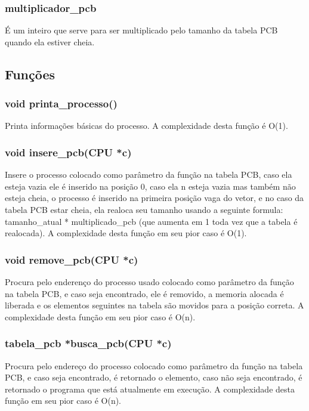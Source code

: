 \documentclass[a4paper, 12pt]{article}
\begin{document}
     \subsubsection{multiplicador\_pcb} É um inteiro que serve para ser multiplicado pelo tamanho da tabela PCB quando ela estiver cheia.
 

\subsection{Funções}
 \subsubsection{void printa\_processo()}
    Printa informações básicas do processo. A complexidade desta função é O(1).
    
 \subsubsection{void insere\_pcb(CPU *c)}
    Insere o processo colocado como parâmetro da função na tabela PCB, caso ela esteja vazia ele é inserido na posição 0, caso ela n esteja vazia mas também não esteja cheia, o processo é inserido na primeira posição vaga do vetor, e no caso da tabela PCB estar cheia, ela realoca seu tamanho usando a seguinte formula: tamanho\_atual * multiplicado\_pcb (que aumenta em 1 toda vez que a tabela é realocada). A complexidade desta função em seu pior caso é O(1).
    
 \subsubsection{void remove\_pcb(CPU *c)}
    Procura pelo enderenço do processo usado colocado como parâmetro da função na tabela PCB, e caso seja encontrado, ele é removido, a memoria alocada é liberada e os elementos seguintes na tabela são movidos para a posição correta. A complexidade desta função em seu pior caso é O(n).
    
 \subsubsection{tabela\_pcb *busca\_pcb(CPU *c)}
    Procura pelo endereço do processo colocado como parâmetro da função na tabela PCB, e caso seja encontrado, é retornado o elemento, caso não seja encontrado, é retornado o programa que está atualmente em execução. A complexidade desta função em seu pior caso é O(n).
    
\end{document}
